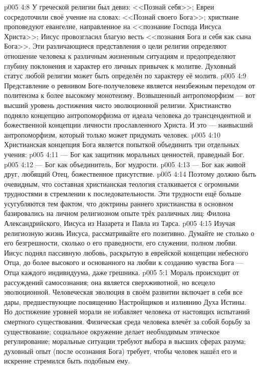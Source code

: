 \vs p005 4:8 У греческой религии был девиз: <<Познай себя>>; Евреи сосредоточили своё учение на словах: <<Познай своего Бога>>; христиане проповедуют евангелие, направленное на <<познание Господа Иисуса Христа>>; Иисус провозгласил благую весть <<познания Бога и себя как сына Бога>>. Эти различающиеся представления о цели религии определяют отношение человека к различным жизненным ситуациям и предопределяют глубину поклонения и характер его личных привычек к молитве. Духовный статус любой религии может быть определён по характеру её молитв.
\vs p005 4:9 \pc Представление о ревнивом Боге\hyp{}получеловеке является неизбежным переходом от политеизма к более высокому монотеизму. Возвышенный антропоморфизм --- вот высший уровень достижения чисто эволюционной религии. Христианство подняло концепцию антропоморфизма от идеала человека до трансцендентной и божественной концепции личности прославленного Христа. И это --- наивысший антропоморфизм, который только может придумать человек.
\vs p005 4:10 \pc Христианская концепция Бога является попыткой объединить три отдельных учения:
\vs p005 4:11  --- Бог как защитник моральных ценностей, праведный Бог.
\vs p005 4:12  --- Бог как объединитель, Бог мудрости.
\vs p005 4:13  --- Бог как живой друг, любящий Отец, божественное присутствие.
\vs p005 4:14 \pc Поэтому должно быть очевидным, что составная христианская теология сталкивается с огромными трудностями в стремлении к последовательности. Эти трудности ещё больше усугубляются тем фактом, что доктрины раннего христианства в основном базировались на личном религиозном опыте трёх различных лиц: Филона Александрийского, Иисуса из Назарета и Павла из Тарса.
\vs p005 4:15 \pc Изучая религиозную жизнь Иисуса, рассматривайте его позитивно. Думайте не столько о его безгрешности, сколько о его праведности, его служении, полном любви. Иисус поднял пассивную любовь, раскрытую в еврейской концепции небесного Отца, до более высокого  и основанного на любви к созданию чувства Бога --- Отца каждого индивидуума, даже грешника.
\vs p005 5:1 Мораль происходит от рассуждений самосознания; она является сверхживотной, но всецело эволюционной. Человеческая эволюция в своём развитии включает в себя все дары, предшествующие посвящению Настройщиков и излиянию Духа Истины. Но достижение уровней морали не избавляет человека от настоящих испытаний смертного существования. Физическая среда человека влечёт за собой борьбу за существование; социальное окружение делает необходимым этическое регулирование; моральные ситуации требуют выбора в высших сферах разума; духовный опыт (после осознания Бога) требует, чтобы человек нашёл его и искренне стремился быть подобным ему.

